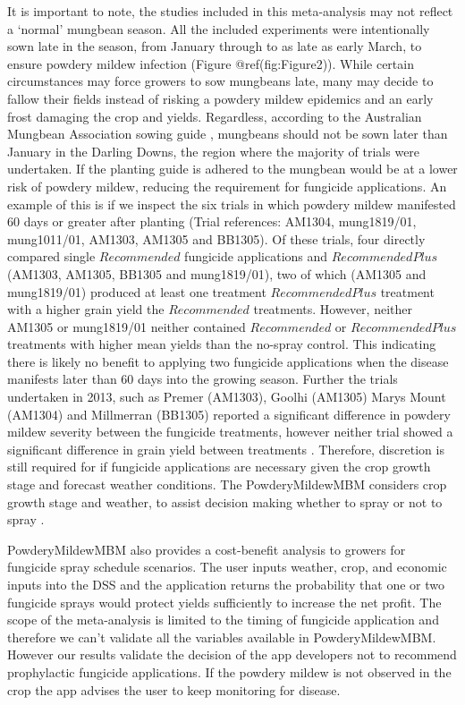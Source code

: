 \documentclass[agronomy,article,submit,moreauthors,pdftex]{mdpi}
\begin{document}
It is important to note, the studies included in this meta-analysis may
not reflect a `normal' mungbean season. All the included experiments
were intentionally sown late in the season, from January through to as
late as early March, to ensure powdery mildew infection (Figure
@ref(fig:Figure2)). While certain circumstances may force growers to sow
mungbeans late, many may decide to fallow their fields instead of
risking a powdery mildew epidemics and an early frost damaging the crop
and yields. Regardless, according to the Australian Mungbean Association
sowing guide \citep{AMAplanting}, mungbeans should not be sown later
than January in the Darling Downs, the region where the majority of
trials were undertaken. If the planting guide is adhered to the mungbean
would be at a lower risk of powdery mildew, reducing the requirement for
fungicide applications. An example of this is if we inspect the six
trials in which powdery mildew manifested 60 days or greater after
planting (Trial references: AM1304, mung1819/01, mung1011/01, AM1303,
AM1305 and BB1305). Of these trials, four directly compared single
\(Recommended\) fungicide applications and \(RecommendedPlus\) (AM1303,
AM1305, BB1305 and mung1819/01), two of which (AM1305 and mung1819/01)
produced at least one treatment \(RecommendedPlus\) treatment with a
higher grain yield the \(Recommended\) treatments. However, neither
AM1305 or mung1819/01 neither contained \(Recommended\) or
\(RecommendedPlus\) treatments with higher mean yields than the no-spray
control. This indicating there is likely no benefit to applying two
fungicide applications when the disease manifests later than 60 days
into the growing season. Further the trials undertaken in 2013, such as
Premer (AM1303), Goolhi (AM1305) Marys Mount (AM1304) and Millmerran
(BB1305) reported a significant difference in powdery mildew severity
between the fungicide treatments, however neither trial showed a
significant difference in grain yield between treatments
\citep[\citet{premer2013}, \citet{Marysmount2013},
\citet{goolhi2013}]{Millmerran2013}. Therefore, discretion is still
required for if fungicide applications are necessary given the crop
growth stage and forecast weather conditions. The PowderyMildewMBM
considers crop growth stage and weather, to assist decision making
whether to spray or not to spray \citep{Diggle}.

PowderyMildewMBM also provides a cost-benefit analysis to growers for
fungicide spray schedule scenarios. The user inputs weather, crop, and
economic inputs into the DSS and the application returns the probability
that one or two fungicide sprays would protect yields sufficiently to
increase the net profit. The scope of the meta-analysis is limited to
the timing of fungicide application and therefore we can't validate all
the variables available in PowderyMildewMBM. However our results
validate the decision of the app developers not to recommend
prophylactic fungicide applications. If the powdery mildew is not
observed in the crop the app advises the user to keep monitoring for
disease.\\
\end{document}
